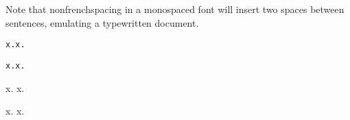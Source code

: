 
Note that \gls{nonfrenchspacing} in a monospaced font will insert
two spaces between sentences, emulating a typewritten document.
\begin{code}
\begin{alltt}
 x. x.

 x. x.
\end{alltt}
\end{code}
\begin{result}\ttfamily
\nonfrenchspacing x. x.

\frenchspacing x. x.
\end{result}

